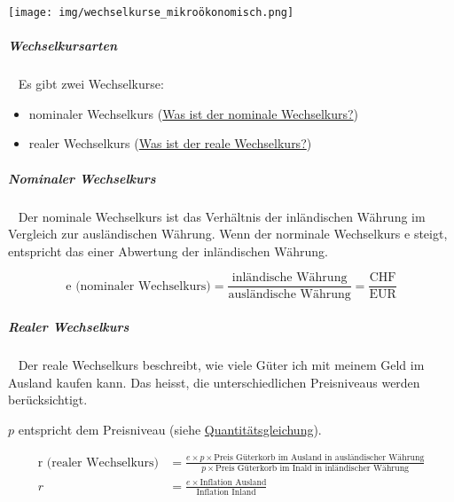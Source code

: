 \documentclass[11pt,twoside,landscape]{article}
\begin{document}
\begin{multicols}{3}
{
\begin{center}
\texttt{[image: img/wechselkurse\_mikroökonomisch.png]}
\end{center}
\label{fig:wechselkurse-als-mikroökonomisches-modell}
}

\subparagraph{Wechselkursarten} \
\label{sec:org0d409d4}
Es gibt zwei Wechselkurse:
\begin{itemize}
\item nominaler Wechselkurs (\href{../../../roam/20220615143018-was_ist_der_nominale_wechselkurs.org}{Was ist der nominale Wechselkurs?})
\item realer Wechselkurs (\href{../../../roam/20220615150048-was_ist_der_reale_wechselkurs.org}{Was ist der reale Wechselkurs?})
\end{itemize}

\subparagraph{Nominaler Wechselkurs} \
\label{sec:orgb60f26b}
Der nominale Wechselkurs ist das Verhältnis der inländischen Währung im Vergleich zur ausländischen Währung.
Wenn der norminale Wechselkurs e steigt, entspricht das einer Abwertung der inländischen Währung.

\begin{equation}
  \label{eqn:nominaler-wechselkurs}
  \text{e (nominaler Wechselkurs)} = \frac{\text{inländische Währung}}{\text{ausländische Währung}} = \frac{\text{CHF}}{\text{EUR}}
\end{equation}

\subparagraph{Realer Wechselkurs} \
\label{sec:org4b9aaa6}
Der reale Wechselkurs beschreibt, wie viele Güter ich mit meinem Geld im Ausland kaufen kann.
Das heisst, die unterschiedlichen Preisniveaus werden berücksichtigt.

\(p\) entspricht dem Preisniveau (siehe \href{../../../roam/20220614170056-wie_sieht_der_theoretische_zusammenhang_zwischen_der_geldpolitik_der_zentralbank_und_der_inflation_aus.org}{Quantitätsgleichung}).

\begin{equation}
  \label{eqn:realer-wechselkurs}
  \begin{align}
  \text{r (realer Wechselkurs)} &= \frac{e \times p \times \text{Preis Güterkorb im Ausland in ausländischer Währung}}{p \times \text{Preis Güterkorb im Inald in inländischer Währung}} \\
    r &= \frac{e \times \text{Inflation Ausland}}{\text{Inflation Inland}}
  \end{align}

\end{equation}


\end{multicols}
\end{document}
